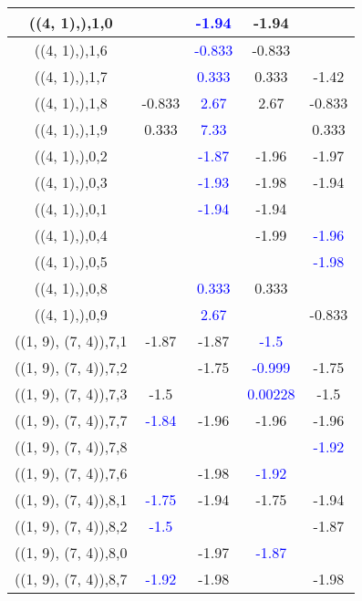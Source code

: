 \documentclass{article}
\begin{document}
\begin{center}
\begin{longtable}{|c|c|c|c|c|}
        	\hline
        	((4, 1),),1,0&& \textcolor{blue}{-1.94}&-1.94&\\
        	\hline
        	((4, 1),),1,6&& \textcolor{blue}{-0.833}&-0.833&\\
        	\hline
        	((4, 1),),1,7&& \textcolor{blue}{0.333}&0.333&-1.42\\
        	\hline
        	((4, 1),),1,8&-0.833& \textcolor{blue}{2.67}&2.67&-0.833\\
        	\hline
        	((4, 1),),1,9&0.333& \textcolor{blue}{7.33}&&0.333\\
        	\hline
        	((4, 1),),0,2&& \textcolor{blue}{-1.87}&-1.96&-1.97\\
        	\hline
        	((4, 1),),0,3&& \textcolor{blue}{-1.93}&-1.98&-1.94\\
        	\hline
        	((4, 1),),0,1&& \textcolor{blue}{-1.94}&-1.94&\\
        	\hline
        	((4, 1),),0,4&&&-1.99& \textcolor{blue}{-1.96}\\
        	\hline
        	((4, 1),),0,5&&&& \textcolor{blue}{-1.98}\\
        	\hline
        	((4, 1),),0,8&& \textcolor{blue}{0.333}&0.333&\\
        	\hline
        	((4, 1),),0,9&& \textcolor{blue}{2.67}&&-0.833\\
        	\hline
        	((1, 9), (7, 4)),7,1&-1.87&-1.87& \textcolor{blue}{-1.5}&\\
        	\hline
        	((1, 9), (7, 4)),7,2&&-1.75& \textcolor{blue}{-0.999}&-1.75\\
        	\hline
        	((1, 9), (7, 4)),7,3&-1.5&& \textcolor{blue}{0.00228}&-1.5\\
        	\hline
        	((1, 9), (7, 4)),7,7& \textcolor{blue}{-1.84}&-1.96&-1.96&-1.96\\
        	\hline
        	((1, 9), (7, 4)),7,8&&&& \textcolor{blue}{-1.92}\\
        	\hline
        	((1, 9), (7, 4)),7,6&&-1.98& \textcolor{blue}{-1.92}&\\
        	\hline
        	((1, 9), (7, 4)),8,1& \textcolor{blue}{-1.75}&-1.94&-1.75&-1.94\\
        	\hline
        	((1, 9), (7, 4)),8,2& \textcolor{blue}{-1.5}&&&-1.87\\
        	\hline
        	((1, 9), (7, 4)),8,0&&-1.97& \textcolor{blue}{-1.87}&\\
        	\hline
        	((1, 9), (7, 4)),8,7& \textcolor{blue}{-1.92}&-1.98&&-1.98\\

\end{longtable}
\end{center}
\end{document}
